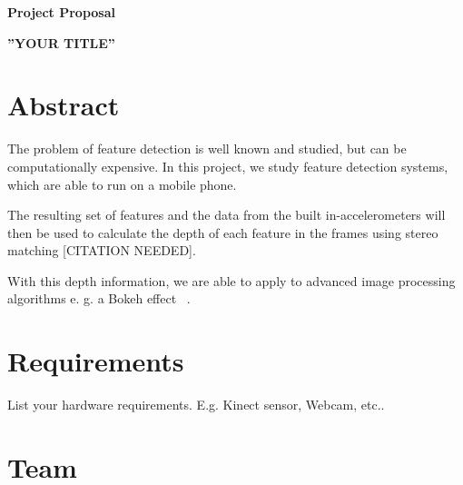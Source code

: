 \documentclass[a4paper,pagesize 10pt]{scrartcl}
\begin{document}
\begin{center}{\Huge\textbf{Project Proposal}}\end{center}
\begin{center}{\Large\textbf{''YOUR TITLE''}}\end{center}

\section{Abstract}

%
%
%
%
%
The problem of feature detection is well known and studied, but can be computationally expensive. In this project, we study feature detection systems, which are able to run on a mobile phone. 

The resulting set of features and the data from the built in-accelerometers will then be used to calculate the depth of each feature in the frames using stereo matching [CITATION NEEDED]. 

With this depth information, we are able to apply to advanced image processing algorithms e. g. a Bokeh effect ~\cite{Lee2008}.


\section{Requirements}
List your hardware requirements. E.g. Kinect sensor, Webcam, etc..

\section{Team}



{\small
	
	
}
\end{document}
